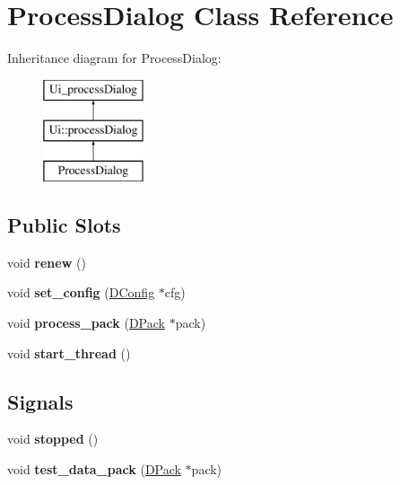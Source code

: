 \hypertarget{class_process_dialog}{
\section{ProcessDialog Class Reference}
\label{class_process_dialog}
}
Inheritance diagram for ProcessDialog:\begin{figure}[H]
\begin{center}
\leavevmode
\includegraphics[height=3.000000cm]{class_process_dialog}
\end{center}
\end{figure}
\subsection*{Public Slots}
\begin{DoxyCompactItemize}
\item 
\hypertarget{class_process_dialog_a22a576af4d2abc52c268dca5d84198e6}{
void {\bfseries renew} ()}
\label{class_process_dialog_a22a576af4d2abc52c268dca5d84198e6}

\item 
\hypertarget{class_process_dialog_afbc030cfd27090f06a352c8b9b5c9dd4}{
void {\bfseries set\_\-config} (\hyperlink{class_d_config}{DConfig} $\ast$cfg)}
\label{class_process_dialog_afbc030cfd27090f06a352c8b9b5c9dd4}

\item 
\hypertarget{class_process_dialog_a862a117b87539153d8c31964fb0d9a13}{
void {\bfseries process\_\-pack} (\hyperlink{struct_d_pack}{DPack} $\ast$pack)}
\label{class_process_dialog_a862a117b87539153d8c31964fb0d9a13}

\item 
\hypertarget{class_process_dialog_aa18cc76fc46524dc707513feaefdb1d8}{
void {\bfseries start\_\-thread} ()}
\label{class_process_dialog_aa18cc76fc46524dc707513feaefdb1d8}

\end{DoxyCompactItemize}
\subsection*{Signals}
\begin{DoxyCompactItemize}
\item 
\hypertarget{class_process_dialog_aa701af7e78592295f979a21a57482e54}{
void {\bfseries stopped} ()}
\label{class_process_dialog_aa701af7e78592295f979a21a57482e54}

\item 
\hypertarget{class_process_dialog_aa76d8f8f2086b3b33752ebe2cd2f0926}{
void {\bfseries test\_\-data\_\-pack} (\hyperlink{struct_d_pack}{DPack} $\ast$pack)}
\label{class_process_dialog_aa76d8f8f2086b3b33752ebe2cd2f0926}

\end{DoxyCompactItemize}
